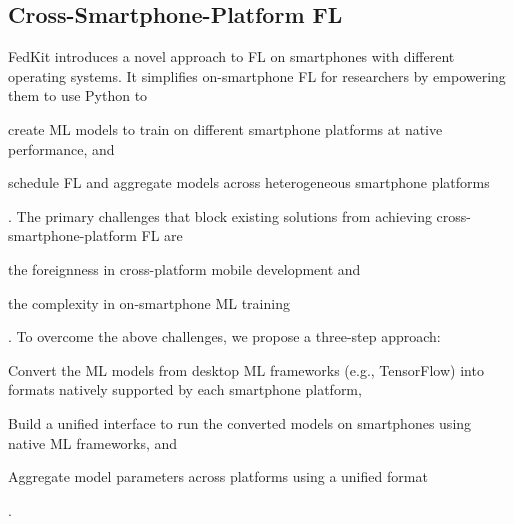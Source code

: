 \documentclass[letterpaper]{article} %
\begin{document}
\subsection{Cross-Smartphone-Platform FL}

FedKit introduces a novel approach to FL on smartphones
with different operating systems.
It simplifies on-smartphone FL for researchers by empowering them to
use Python to
\begin{enumerate*}[label=\arabic*)]
    \item create ML models to train on different smartphone platforms at
        native performance, and
    \item schedule FL and aggregate models across
        heterogeneous smartphone platforms
\end{enumerate*}.
The primary challenges that block existing solutions from
achieving cross-smartphone-platform FL are
\begin{enumerate*}[label=\arabic*)]
    \item the foreignness in cross-platform mobile development and
    \item the complexity in on-smartphone ML training
\end{enumerate*}.
To overcome the above challenges, we propose a three-step approach:
\begin{enumerate*}[label=\arabic*.]
    \item Convert the ML models from desktop ML frameworks (e.g., TensorFlow)
        into formats natively supported by each smartphone platform,
    \item Build a unified interface to run the converted models on smartphones
        using native ML frameworks, and
    \item Aggregate model parameters across platforms using a unified format
\end{enumerate*}.
\end{document}
